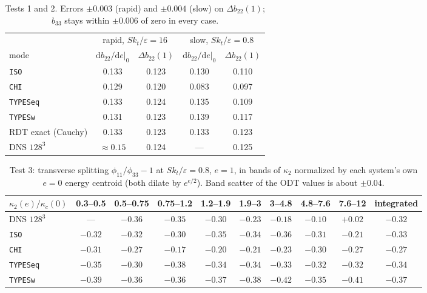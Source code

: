 \documentclass[11pt,a4paper]{article}
\newcommand{\kt}{k_t}
\begin{document}
\begin{table}[h!]
\centering\small
\begin{tabular}{l|cc|cc}
\toprule
 & \multicolumn{2}{c|}{rapid, $S\kt/\varepsilon=16$} & \multicolumn{2}{c}{slow, $S\kt/\varepsilon=0.8$}\\
mode & $\mathrm db_{22}/\mathrm de|_0$ & $\Delta b_{22}(1)$ & $\mathrm db_{22}/\mathrm de|_0$ & $\Delta b_{22}(1)$\\
\midrule
\texttt{ISO}     & 0.133 & 0.123 & 0.130 & 0.110 \\
\texttt{CHI}     & 0.129 & 0.120 & 0.083 & 0.097 \\
\texttt{TYPESeq} & 0.133 & 0.124 & 0.135 & 0.109 \\
\texttt{TYPESw}  & 0.131 & 0.123 & 0.139 & 0.117 \\
\midrule
RDT exact (Cauchy) & 0.133 & 0.123 & 0.133 & 0.123 \\
DNS $128^3$        & $\approx0.15$ & 0.124 & --- & 0.125 \\
\bottomrule
\end{tabular}
\caption{Tests 1 and 2. Errors $\pm0.003$ (rapid) and $\pm0.004$ (slow) on
$\Delta b_{22}(1)$; $b_{33}$ stays within $\pm0.006$ of zero in every case.}
\label{tab:t12}
\end{table}

\begin{table}[h!]
\centering\small
\setlength{\tabcolsep}{4.5pt}
\begin{tabular}{lcccccccc|c}
\toprule
$\kappa_2(e)/\kappa_c(0)$ & 0.3--0.5 & 0.5--0.75 & 0.75--1.2 & 1.2--1.9 & 1.9--3 & 3--4.8 & 4.8--7.6 & 7.6--12 & integrated\\
\midrule
DNS $128^3$      & ---    & $-0.36$ & $-0.35$ & $-0.30$ & $-0.23$ & $-0.18$ & $-0.10$ & $+0.02$ & $-0.32$\\
\texttt{ISO}     & $-0.32$ & $-0.32$ & $-0.30$ & $-0.35$ & $-0.34$ & $-0.36$ & $-0.31$ & $-0.21$ & $-0.33$\\
\texttt{CHI}     & $-0.31$ & $-0.27$ & $-0.17$ & $-0.20$ & $-0.21$ & $-0.23$ & $-0.30$ & $-0.27$ & $-0.27$\\
\texttt{TYPESeq} & $-0.35$ & $-0.30$ & $-0.38$ & $-0.34$ & $-0.34$ & $-0.33$ & $-0.32$ & $-0.32$ & $-0.34$\\
\texttt{TYPESw}  & $-0.39$ & $-0.36$ & $-0.36$ & $-0.37$ & $-0.38$ & $-0.42$ & $-0.35$ & $-0.41$ & $-0.37$\\
\bottomrule
\end{tabular}
\caption{Test 3: transverse splitting $\phi_{11}/\phi_{33}-1$ at
$S\kt/\varepsilon=0.8$, $e=1$, in bands of $\kappa_2$ normalized by each
system's own $e=0$ energy centroid (both dilate by $e^{e/2}$). Band scatter
of the ODT values is about $\pm0.04$.}
\label{tab:t3}
\end{table}
\end{document}
